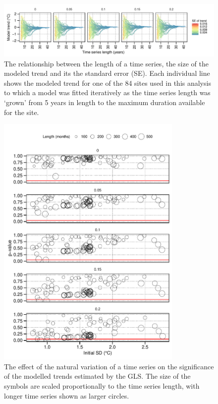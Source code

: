 \documentclass[]{ametsoc}
\begin{document}
\begin{figure}
\centering \includegraphics[width=01.0\textwidth]{figure03}
\caption[\small The relationship between time series length and the standard error (SE) of the modelled trend]{The relationship between the length of a time series, the size of the modeled trend and its the standard error (SE). Each individual line shows the modeled trend for one of the 84 sites used in this analysis to which a model was fitted iteratively as the time series length was `grown' from 5 years in length to the maximum duration available for the site.}
\label{figure03}
\end{figure}

\begin{figure}
\centering \includegraphics[width=0.8\textwidth]{figure04}
\caption[\small The effect of the natural variation of a time series on the significance of the modelled trend]{The effect of the natural variation of a time series on the significance of the modelled trends estimated by the GLS. The size of the symbols are scaled proportionally to the time series length, with longer time series shown as larger circles.}
\label{figure04}
\end{figure}
\end{document}
